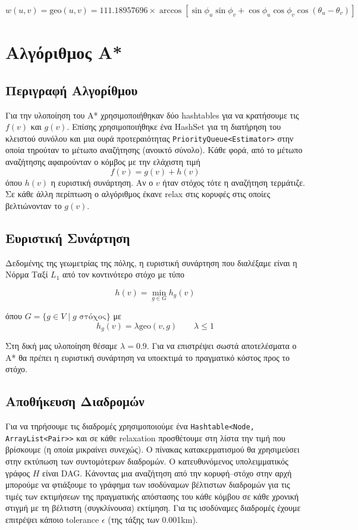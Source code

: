 \documentclass[a4paper,12pt]{article}
\begin{document}
$$w(u, v) = \mathrm{geo}(u, v) = 111.18957696 \times \arccos \left [ \sin \phi_u \sin \phi_v + \cos \phi_u \cos \phi_v \cos (\theta_u - \theta_v) \right ]$$





\section{Αλγόριθμος Α*}

\subsection{Περιγραφή Αλγορίθμου}
Για την υλοποίηση του Α* χρησιμοποιήθηκαν δύο hashtables για να κρατήσουμε τις $f(v)$ και $g(v)$. Επίσης χρησιμοποιήθηκε ένα HashSet για τη διατήρηση του κλειστού συνόλου και μια ουρά προτεραιότητας \texttt{PriorityQueue<Estimator>} στην οποία τηρούταν το μέτωπο αναζήτησης (ανοικτό σύνολο). Κάθε φορά, από το μέτωπο αναζήτησης αφαιρούνταν ο κόμβος με την ελάχιστη τιμή $$f(v) = g(v) + h(v)$$ όπου $h(v)$ η ευριστική συνάρτηση. Αν ο $v$ ήταν στόχος τότε η αναζήτηση τερμάτιζε. Σε κάθε άλλη περίπτωση ο αλγόριθμος έκανε relax στις κορυφές στις οποίες βελτιώνονταν το $g(v)$. 

\subsection{Ευριστική Συνάρτηση}

Δεδομένης της γεωμετρίας της πόλης, η ευριστική συνάρτηση που διαλέξαμε είναι η Νόρμα Ταξί $L_1$ από τον κοντινότερο στόχο με τύπο 

$$h(v) = \min_{g \in G} h_g(v)$$

όπου $G = \{ g \in V \mid g \text{ στόχος} \}$ με $$h_g(v) = \lambda \mathrm{geo}(v, g) \qquad \lambda \le 1$$
 
Στη δική μας υλοποίηση θέσαμε $\lambda=0.9$. Για να επιστρέψει σωστά αποτελέσματα ο Α* θα πρέπει η ευριστική συνάρτηση να υποεκτιμά το πραγματικό κόστος προς το στόχο.
\subsection{Αποθήκευση Διαδρομών} 

Για να τηρήσουμε τις διαδρομές χρησιμοποιούμε ένα \texttt{Hashtable<Node, ArrayList<Pair>>} και σε κάθε relaxation προσθέτουμε στη λίστα την τιμή που βρίσκουμε (η οποία μικραίνει συνεχώς). Ο πίνακας κατακερματισμού θα χρησιμεύσει στην εκτύπωση των συντομότερων διαδρομών. Ο κατευθυνόμενος υπολειμματικός γράφος $H$ είναι DAG. Κάνοντας μια αναζήτηση από την κορυφή--στόχο στην αρχή μπορούμε να φτιάξουμε το γράφημα των ισοδύναμων βέλτιστων διαδρομών για τις τιμές των εκτιμήσεων της πραγματικής απόστασης του κάθε κόμβου σε κάθε χρονική στιγμή με τη βέλτιστη (συγκλίνουσα) εκτίμηση. Για τις ισοδύναμες διαδρομές έχουμε επιτρέψει κάποιο tolerance $\epsilon$ (της τάξης των 0.001km).  
\end{document}
